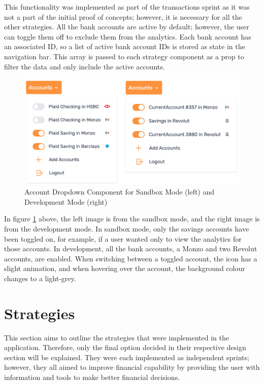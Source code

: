 This functionality was implemented as part of the transactions sprint as it was not a part of the initial proof of concepts; however, it is necessary for all the other strategies. All the bank accounts are active by default; however, the user can toggle them off to exclude them from the analytics. Each bank account has an associated ID, so a list of active bank account IDs is stored as state in the navigation bar. This array is passed to each strategy component as a prop to filter the data and only include the active accounts.

\begin{figure}[H]
	\centering
	\includegraphics[width=\textwidth]{images/accounts_dropdown.png}
	\caption{Account Dropdown Component for Sandbox Mode (left) and Development Mode (right)}
	\label{fig:AccountsDropdown}
\end{figure}

In figure \ref{fig:AccountsDropdown} above, the left image is from the sandbox mode, and the right image is from the development mode. In sandbox mode, only the savings accounts have been toggled on, for example, if a user wanted only to view the analytics for those accounts. In development, all the bank accounts, a Monzo and two Revolut accounts, are enabled. When switching between a toggled account, the icon has a slight animation, and when hovering over the account, the background colour changes to a light-grey.


\section{Strategies}
This section aims to outline the strategies that were implemented in the application. Therefore, only the final option decided in their respective design section will be explained. They were each implemented as independent sprints; however, they all aimed to improve financial capability by providing the user with information and tools to make better financial decisions.

